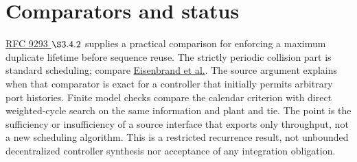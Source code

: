\documentclass[11pt]{article}
\begin{document}
\section{Comparators and status}
\href{https://www.rfc-editor.org/rfc/rfc9293.html#section-3.4.2}{RFC 9293
\(\S3.4.2\)} supplies a practical comparison for enforcing a
maximum duplicate lifetime before sequence reuse. The strictly
periodic collision part is standard scheduling; compare
\href{https://drops.dagstuhl.de/storage/16dagstuhl-seminar-proceedings/dsp-vol10071/DagSemProc.10071.13/DagSemProc.10071.13.pdf}{Eisenbrand
et al.}. The source argument explains when that comparator is exact
for a controller that initially permits arbitrary port histories.
Finite model checks compare the calendar criterion with direct
weighted-cycle search on the same information and plant and tie.
The point is the sufficiency or insufficiency of a source interface
that exports only throughput, not a new scheduling algorithm.
This is a restricted recurrence result, not unbounded decentralized
controller synthesis nor acceptance of any integration obligation.
\end{document}
